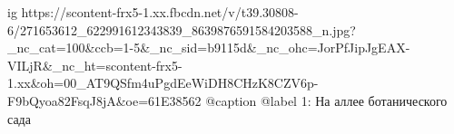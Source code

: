  
 
 
 
 

\ifcmt
  ig https://scontent-frx5-1.xx.fbcdn.net/v/t39.30808-6/271653612_622991612343839_8639876591584203588_n.jpg?_nc_cat=100&ccb=1-5&_nc_sid=b9115d&_nc_ohc=JorPfJipJgEAX-VILjR&_nc_ht=scontent-frx5-1.xx&oh=00_AT9QSfm4uPgdEeWiDH8CHzK8CZV6p-F9bQyoa82FsqJ8jA&oe=61E38562
  @caption @label 1: На аллее ботанического сада
\fi
